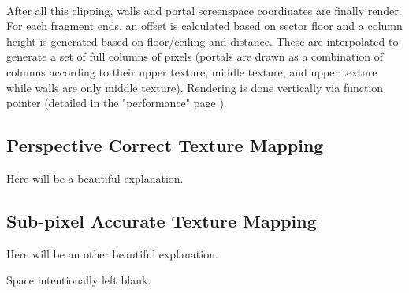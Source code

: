 \\

 \vspace{10mm}















\vspace{-4mm}
After all this clipping, walls and portal screenspace coordinates are finally render. For each fragment ends, an  offset is calculated based on sector floor and a column height is generated based on floor/ceiling and distance. These are interpolated to generate a set of full columns of pixels (portals are drawn as a combination of columns according to their upper texture, middle texture, and upper texture while walls are only middle texture). Rendering is done vertically via  function pointer (detailed in the "performance" page \pageref{performances}).\\

\subsection{Perspective Correct Texture Mapping}
Here will be a beautiful explanation.
\pagebreak

\subsection{Sub-pixel Accurate Texture Mapping}
Here will be an other beautiful explanation.
\newpage
\par
Space intentionally left blank.
\vspace{2.5cm}

